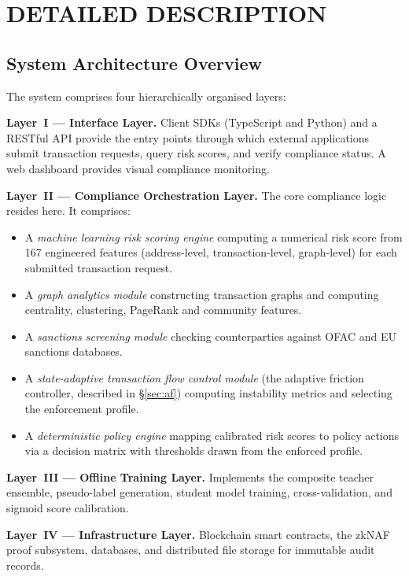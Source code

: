 \documentclass[12pt,a4paper]{article}
\begin{document}
\section{DETAILED DESCRIPTION}

\subsection{System Architecture Overview}

The system comprises four hierarchically organised layers:

\textbf{Layer~I --- Interface Layer.}
Client SDKs (TypeScript and Python) and a RESTful API provide the entry
points through which external applications submit transaction requests,
query risk scores, and verify compliance status. A web dashboard provides
visual compliance monitoring.

\textbf{Layer~II --- Compliance Orchestration Layer.}
The core compliance logic resides here. It comprises:
\begin{itemize}
\item A \emph{machine learning risk scoring engine} computing a numerical
risk score from 167 engineered features (address-level, transaction-level,
graph-level) for each submitted transaction request.
\item A \emph{graph analytics module} constructing transaction graphs and
computing centrality, clustering, PageRank and community features.
\item A \emph{sanctions screening module} checking counterparties against
OFAC and EU sanctions databases.
\item A \emph{state-adaptive transaction flow control module} (the adaptive
friction controller, described in \S\ref{sec:af}) computing instability
metrics and selecting the enforcement profile.
\item A \emph{deterministic policy engine} mapping calibrated risk scores to
policy actions via a decision matrix with thresholds drawn from the enforced
profile.
\end{itemize}

\textbf{Layer~III --- Offline Training Layer.}
Implements the composite teacher ensemble, pseudo-label generation, student
model training, cross-validation, and sigmoid score calibration.

\textbf{Layer~IV --- Infrastructure Layer.}
Blockchain smart contracts, the zkNAF proof subsystem, databases, and
distributed file storage for immutable audit records.
\end{document}

